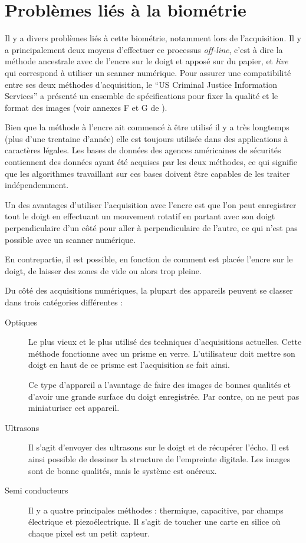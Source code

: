 \section{Problèmes liés à la biométrie}

Il y a divers problèmes liés à cette biométrie, notamment lors de
l'acquisition. Il y a principalement deux moyens d'effectuer ce
processus \emph{off-line}, c'est à dire la méthode ancestrale avec de
l'encre sur le doigt et apposé sur du papier, et \emph{live} qui
correspond à utiliser un scanner numérique. Pour assurer une
compatibilité entre ses deux méthodes d'acquisition, le ``US Criminal
Justice Information Services'' a présenté un ensemble de
spécifications pour fixer la qualité et le format des images (voir
annexes F et G de \cite{nla.cat-vn4185009}).

Bien que la méthode à l'encre ait commencé à être utilisé il y a très
longtemps (plus d'une trentaine d'année) elle est toujours utilisée
dans des applications à caractères légales. Les bases de données des
agences américaines de sécurités contiennent des données ayant été
acquises par les deux méthodes, ce qui signifie que les algorithmes
travaillant sur ces bases doivent être capables de les traiter
indépendemment.

Un des avantages d'utiliser l'acquisition avec l'encre est que l'on
peut enregistrer tout le doigt en effectuant un mouvement rotatif en
partant avec son doigt perpendiculaire d'un côté pour aller à
perpendiculaire de l'autre, ce qui n'est pas possible avec un scanner
numérique.

En contrepartie, il est possible, en fonction de comment est placée
l'encre sur le doigt, de laisser des zones de vide ou alors trop
pleine.

Du côté des acquisitions numériques, la plupart des appareils peuvent
se classer dans trois catégories différentes :

\begin{description}
\item[Optiques] Le plus vieux et le plus utilisé des techniques
  d'acquisitions actuelles. Cette méthode fonctionne avec un prisme en
  verre. L'utilisateur doit mettre son doigt en haut de ce prisme est
  l'acquisition se fait ainsi.

  Ce type d'appareil a l'avantage de faire des images de bonnes
  qualités et d'avoir une grande surface du doigt enregistrée. Par
  contre, on ne peut pas miniaturiser cet appareil.
\item[Ultrasons] Il s'agit d'envoyer des ultrasons sur le doigt et de
  récupérer l'écho. Il est ainsi possible de dessiner la structure de
  l'empreinte digitale. Les images sont de bonne qualités, mais le
  système est onéreux.
\item[Semi conducteurs] Il y a quatre principales méthodes :
  thermique, capacitive, par champs électrique et piezoélectrique.  Il
  s'agit de toucher une carte en silice où chaque pixel est un petit
  capteur.
\end{description}

